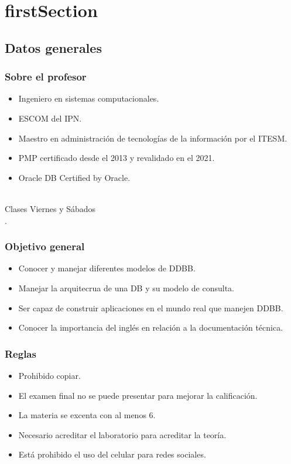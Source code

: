 \newpage
\part{\acrlong{firstSection}}
\chapter{Datos generales}

\section{Sobre el profesor}
\begin{itemize}
	\item Ingeniero en sistemas computacionales.
	\item ESCOM del IPN.
	\item Maestro en administraci\'{o}n de tecnolog\'{i}as de la informaci\'{o}n por el ITESM.
	\item PMP certificado desde el 2013 y revalidado en el 2021.
	\item Oracle DB Certified by Oracle.
\end{itemize}
\\
Clases Viernes y S\'{a}bados\\.
\section{Objetivo general}
\begin{itemize}
	\item Conocer y manejar diferentes modelos de DDBB.
	\item Manejar la arquitecrua de una DB y su modelo de consulta.
	\item Ser capaz de construir aplicaciones en el mundo real que manejen DDBB.
	\item Conocer la importancia del ingl\'{e}s en relaci\'{o}n a la documentaci\'{o}n t\'{e}cnica.
\end{itemize}

\section{Reglas}
\begin{itemize}
	\item Prohibido copiar.
	\item El examen final no se puede presentar para mejorar la calificaci\'{o}n.
	\item La materia se excenta con al menos 6.
	\item Necesario acreditar el laboratorio para acreditar la teor\'{i}a.
	\item Est\'{a} prohibido el uso del celular para redes sociales.
\end{itemize}

